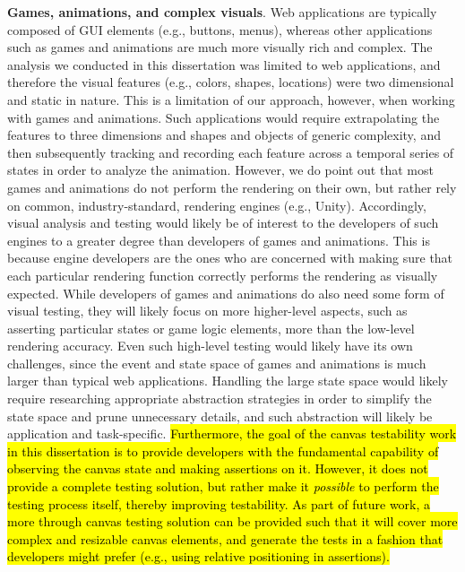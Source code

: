 {\textbf{Games, animations, and complex visuals}.} 
Web applications are typically composed of GUI elements (e.g., buttons, menus), whereas other applications such as games and animations are much more visually rich and complex. 
The analysis we conducted in this dissertation was limited to web applications, and therefore the visual features (e.g., colors, shapes, locations) were two dimensional and static in nature. This is a limitation of our approach, however, when working with games and animations. Such applications would require extrapolating the features to three dimensions and shapes and objects of generic complexity, and then  subsequently tracking and recording each feature across a temporal series of states in order to analyze the animation. However, we do point out that most games and animations do not perform the rendering on their own, but rather rely on common, industry-standard, rendering engines (e.g., Unity). Accordingly, visual analysis and testing would likely be of interest to the 
developers of such engines to a greater degree than developers of games and animations. This is because engine developers are the ones who are concerned with making sure that each particular rendering 
function correctly performs the rendering as visually expected. 
While developers of games and animations do also need some form of visual testing, they will likely focus on more higher-level aspects, such as asserting particular states or game logic elements, more than the low-level rendering accuracy. Even such high-level testing would likely have its own challenges, since the event and state space of games and animations is much larger than typical web applications. 
Handling the large state space would likely require researching appropriate abstraction strategies in order to simplify the state space and prune unnecessary details, and such abstraction 
will likely be application and task-specific. 
\hl{
Furthermore, the goal of the canvas testability work in this dissertation is to provide developers with the fundamental capability of observing the canvas state and making assertions on it. However, it does not provide a complete testing solution, but rather make it \emph{possible} to perform the testing process itself, thereby improving testability. As part of future work, a more through canvas testing solution can be provided such that 
it will cover more complex and resizable canvas elements, and generate the tests in a fashion that developers might prefer (e.g., using relative positioning in assertions). 
}

